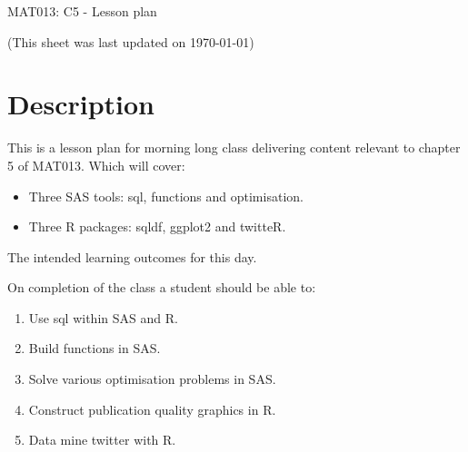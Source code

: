 \documentclass[12pt]{article}
\begin{document}
\begin{center}
\huge{MAT013: C5 - Lesson plan}
\end{center}
\begin{center}
\tiny{(This sheet was last updated on \today)}
\end{center}



\section{Description}

This is a lesson plan for morning long class delivering content relevant to chapter 5 of MAT013. Which will cover:

\begin{itemize}
\item Three SAS tools: sql, functions and optimisation.
\item Three R packages: sqldf, ggplot2 and twitteR.
\end{itemize}

The intended learning outcomes for this day.

On completion of the class a student should be able to:

\begin{enumerate}[label=\Alph*]
\item Use sql within SAS and R.
\item Build functions in SAS.
\item Solve various optimisation problems in SAS.
\item Construct publication quality graphics in R.
\item Data mine twitter with R.
\end{enumerate}
\end{document}
